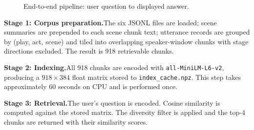 \documentclass[10pt,conference]{IEEEtran}
\begin{document}
\vspace{6pt}
\begin{figure}[H]
\centering
{}
\vspace{4pt}
\caption{End-to-end pipeline: user question to displayed answer.}
\label{fig:pipeline}
\end{figure}

\vspace{2pt}
\noindent\textbf{Stage 1: Corpus preparation.}\enspace The six JSONL
files are loaded; scene summaries are prepended to each scene chunk
text; utterance records are grouped by (play, act, scene) and tiled
into overlapping speaker-window chunks with stage directions excluded.
The result is 918 retrievable chunks.

\medskip\noindent\textbf{Stage 2: Indexing.}\enspace All 918 chunks
are encoded with \texttt{all-MiniLM-L6-v2}, producing a
$918\!\times\!384$ float matrix stored to \texttt{index\_cache.npz}.
This step takes approximately 60 seconds on CPU and is performed once.

\medskip\noindent\textbf{Stage 3: Retrieval.}\enspace The user's
question is encoded. Cosine similarity is computed against the stored
matrix. The diversity filter is applied and the top-4 chunks are
returned with their similarity scores.
\end{document}
